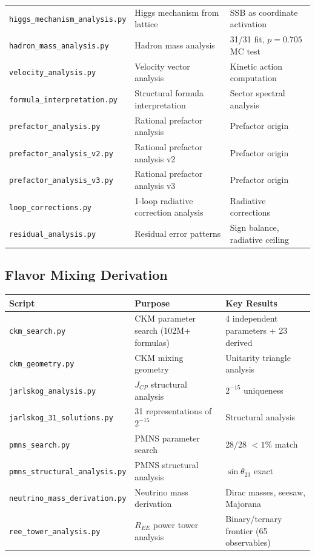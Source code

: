 \begin{center}
\begin{tabular}{lll}
\texttt{higgs\_mechanism\_analysis.py} & Higgs mechanism from lattice & SSB as coordinate activation \\
\texttt{hadron\_mass\_analysis.py} & Hadron mass analysis & 31/31 fit, $p = 0.705$ MC test \\
\texttt{velocity\_analysis.py} & Velocity vector analysis & Kinetic action computation \\
\texttt{formula\_interpretation.py} & Structural formula interpretation & Sector spectral analysis \\
\texttt{prefactor\_analysis.py} & Rational prefactor analysis & Prefactor origin \\
\texttt{prefactor\_analysis\_v2.py} & Rational prefactor analysis v2 & Prefactor origin \\
\texttt{prefactor\_analysis\_v3.py} & Rational prefactor analysis v3 & Prefactor origin \\
\texttt{loop\_corrections.py} & 1-loop radiative correction analysis & Radiative corrections \\
\texttt{residual\_analysis.py} & Residual error patterns & Sign balance, radiative ceiling \\
\hline\hline
\end{tabular}
\end{center}

\subsection{Flavor Mixing Derivation}\label{app:mixing_code}

\begin{center}
\small
{}
\label{tab:mixing_scripts}
\begin{tabular}{lll}
\hline\hline
Script & Purpose & Key Results \\
\hline
\texttt{ckm\_search.py} & CKM parameter search (102M+ formulas) & 4 independent parameters + 23 derived \\
\texttt{ckm\_geometry.py} & CKM mixing geometry & Unitarity triangle analysis \\
\texttt{jarlskog\_analysis.py} & $J_{CP}$ structural analysis & $2^{-15}$ uniqueness \\
\texttt{jarlskog\_31\_solutions.py} & 31 representations of $2^{-15}$ & Structural analysis \\
\texttt{pmns\_search.py} & PMNS parameter search & 28/28 $< 1\%$ match \\
\texttt{pmns\_structural\_analysis.py} & PMNS structural analysis & $\sin\theta_{23}$ exact \\
\texttt{neutrino\_mass\_derivation.py} & Neutrino mass derivation & Dirac masses, seesaw, Majorana \\
\texttt{ree\_tower\_analysis.py} & $R_{EE}$ power tower analysis & Binary/ternary frontier (65 observables) \\
\hline\hline
\end{tabular}
\end{center}

